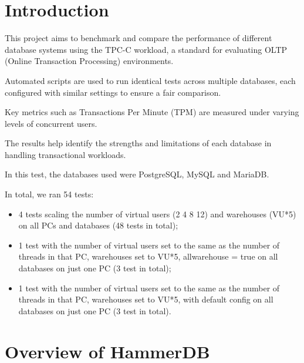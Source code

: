 
\section{Introduction}
\label{sec:intro}

This project aims to benchmark and compare the performance of different database systems using the TPC-C workload, a standard for evaluating OLTP (Online Transaction Processing) environments.

Automated scripts are used to run identical tests across multiple databases, each configured with similar settings to ensure a fair comparison.

Key metrics such as Transactions Per Minute (TPM) are measured under varying levels of concurrent users.

The results help identify the strengths and limitations of each database in handling transactional workloads.

In this test, the databases used were PostgreSQL, MySQL and MariaDB.

In total, we ran 54 tests:

\begin{itemize}
    \setlength\itemsep{0.1em}
    \item 4 tests scaling the number of virtual users (2 4 8 12) and warehouses (VU*5) on all PCs and databases (48 tests in total);
    \item 1 test with the number of virtual users set to the same as the number of threads in that PC, warehouses set to VU*5, allwarehouse = true on all databases on just one PC (3 test in total);
    \item 1 test with the number of virtual users set to the same as the number of threads in that PC, warehouses set to VU*5, with default config on all databases on just one PC (3 test in total).
\end{itemize}

\section{Overview of HammerDB}
\label{sec:hammerdb}

